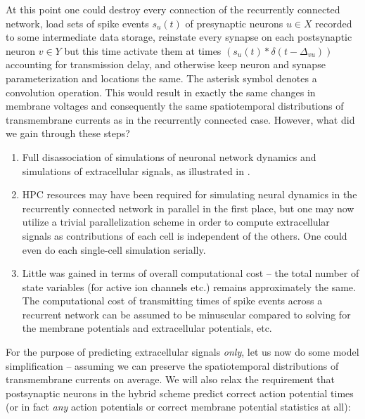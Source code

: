 At this point one could destroy every connection of the recurrently connected network,
load sets of spike events $s_u(t)$ of presynaptic neurons $u \in X$ recorded to some intermediate data storage,
reinstate every synapse on each postsynaptic neuron $v \in Y$ but this time activate them at times
$\left(s_u(t) \ast \delta(t-\Delta_{vu})\right)$
accounting for transmission delay,
and otherwise keep neuron and synapse parameterization and locations the same.
The asterisk symbol denotes a convolution operation.
This would result in exactly the same changes in membrane voltages and consequently the same spatiotemporal distributions of transmembrane currents as in the recurrently connected case.
However, what did we gain through these steps?

\begin{enumerate}
\item Full disassociation of simulations of neuronal network dynamics and simulations of extracellular signals,
as illustrated in .
\item HPC resources may have been required for simulating neural dynamics in the recurrently connected network in parallel in the first place,
but one may now utilize a trivial parallelization scheme in order to compute extracellular signals as contributions of each cell is independent of the others.
One could even do each single-cell simulation serially.
\item Little was gained in terms of overall computational cost -- the total number of state variables (for active ion channels etc.) remains approximately the same.
The computational cost of transmitting times of spike events across a recurrent network can be assumed to be minuscular compared to solving for the membrane potentials and extracellular potentials, etc.
\end{enumerate}

For the purpose of predicting extracellular signals \emph{only}, let us now do some model simplification -- assuming we can preserve the spatiotemporal distributions of transmembrane currents on average. We will also relax the requirement  that postsynaptic neurons in the hybrid scheme predict correct action potential times (or in fact \emph{any} action potentials or correct membrane potential statistics at all): 

